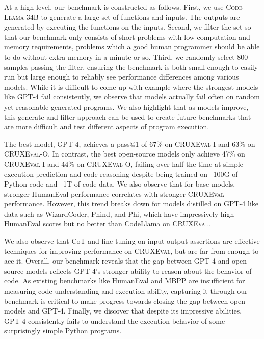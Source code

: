 \documentclass{article}
\newcommand{\benchmark}{\textsc{CRUXEval}\xspace}
\newcommand{\benchmarki}{\textsc{CRUXEval-I}\xspace}
\newcommand{\benchmarko}{\textsc{CRUXEval-O}\xspace}
\newcommand{\codellamalarge}{\textsc{Code Llama 34B}\xspace}
\theoremstyle{plain}
\theoremstyle{definition}
\theoremstyle{remark}
\begin{document}
At a high level, our benchmark is constructed as follows. First, we use \codellamalarge to generate a large set of functions and inputs. The outputs are generated by executing the functions on the inputs. Second, we filter the set so that our benchmark only consists of short problems with low computation and memory requirements, problems which a good human programmer should be able to do without extra memory in a minute or so. Third, we randomly select 800 samples passing the filter, ensuring the benchmark is both small enough to easily run but large enough to reliably see performance differences among various models. While it is difficult to come up with example where the strongest models like GPT-4 fail consistently, we observe that models actually fail often on random yet reasonable generated programs. We also highlight that as models improve, this generate-and-filter approach can be used to create future benchmarks that are more difficult and test different aspects of program execution.


The best model, GPT-4, achieves a pass@1 of 67\% on \benchmarki and 63\% on \benchmarko. In contrast, the best open-source models only achieve 47\% on \benchmarki and 44\% on \benchmarko, failing over half the time at simple execution prediction and code reasoning despite being trained on ~100G of Python code and ~1T of code data. We also observe that for base models, stronger HumanEval performance correlates with stronger \benchmark performance. However, this trend breaks down for models distilled on GPT-4 like data such as WizardCoder, Phind, and Phi, which have impressively high HumanEval scores but no better than CodeLlama on \benchmark.

We also observe that CoT and fine-tuning on input-output assertions are effective techniques for improving performance on \benchmark, but are far from enough to ace it. Overall, our benchmark reveals that the gap between GPT-4 and open source models reflects GPT-4's stronger ability to reason about the behavior of code. As existing benchmarks like HumanEval and MBPP are insufficient for measuring code understanding and execution ability, capturing it through our benchmark is critical to make progress towards closing the gap between open models and GPT-4. Finally, we discover that despite its impressive abilities, GPT-4 consistently fails to understand the execution behavior of some surprisingly simple Python programs. 


%
\end{document}
